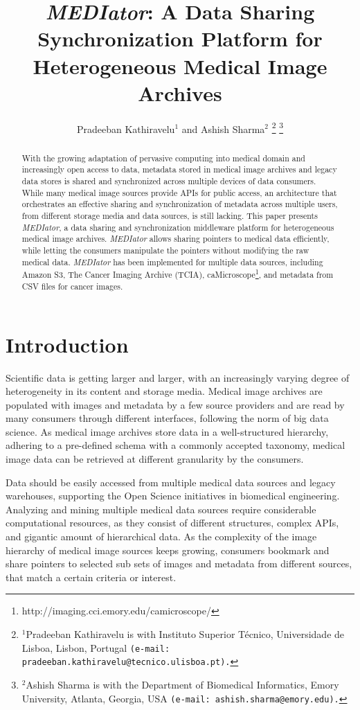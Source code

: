 \documentclass[letterpaper, 10 pt, conference]{ieeeconf}  %
\title{\LARGE \bf
	\textit{MEDIator}: A Data Sharing Synchronization Platform for Heterogeneous Medical Image Archives}
\author{Pradeeban Kathiravelu$^{1}$ and Ashish Sharma$^{2}$%
	\thanks{$^{1}$Pradeeban Kathiravelu is with Instituto Superior T\'{e}cnico, Universidade de Lisboa, Lisbon, Portugal
		{\tt\small (e-mail: pradeeban.kathiravelu@tecnico.ulisboa.pt).}}%
	\thanks{$^{2}$Ashish Sharma is with the Department of Biomedical Informatics, Emory University,
		Atlanta, Georgia, USA
		{\tt\small (e-mail: ashish.sharma@emory.edu).}}%
}
\begin{document}
	
	\maketitle
	\thispagestyle{empty}
	\pagestyle{empty}
	
\begin{abstract}
With the growing adaptation of pervasive computing into medical domain and increasingly open access to data, metadata stored in medical image archives and legacy data stores is shared and synchronized across multiple devices of data consumers. While many medical image sources provide APIs for public access, an architecture that orchestrates an effective sharing and synchronization of metadata across multiple users, from different storage media and data sources, is still lacking. This paper presents \textit{MEDIator}, a data sharing and synchronization middleware platform for heterogeneous medical image archives. \textit{MEDIator} allows sharing pointers to medical data efficiently, while letting the consumers manipulate the pointers without modifying the raw medical data. \textit{MEDIator} has been implemented for multiple data sources, including Amazon S3, The Cancer Imaging Archive (TCIA), caMicroscope\footnote{http://imaging.cci.emory.edu/camicroscope/}, and metadata from CSV files for cancer images.
\end{abstract}



\section{Introduction}
Scientific data is getting larger and larger, with an increasingly varying degree of heterogeneity in its content and storage media. Medical image archives are populated with images and metadata by a few source providers and are read by many consumers through different interfaces, following the norm of big data science. As medical image archives store data in a well-structured hierarchy, adhering to a pre-defined schema with a commonly accepted taxonomy, medical image data can be retrieved at different granularity by the consumers.

Data should be easily accessed from multiple medical data sources and legacy warehouses, supporting the Open Science initiatives in biomedical engineering. Analyzing and mining multiple medical data sources require considerable computational resources, as they consist of different structures, complex APIs, and gigantic amount of hierarchical data. As the complexity of the image hierarchy of medical image sources keeps growing, consumers bookmark and share pointers to selected sub sets of images and metadata from different sources, that match a certain criteria or interest. 
\end{document}
